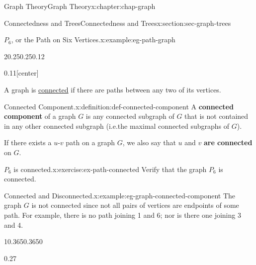 \documentclass[oneside,10pt,]{book}
\newcommand{\terminology}[1]{\textbf{#1}}
\numberwithin{equation}{section}
\begin{document}
\begin{chapterptx}{Graph Theory}{}{Graph Theory}{}{}{x:chapter:chap-graph}
\begin{sectionptx}{Connectedness and Trees}{}{Connectedness and Trees}{}{}{x:section:sec-graph-trees}
\begin{example}{\(P_6\), or the Path on Six Vertices.}{x:example:eg-path-graph}
\begin{sidebyside}{2}{0.25}{0.25}{0.12}
\begin{sbspanel}{0.11}[center]
{
}%
\end{sbspanel}%
\end{sidebyside}%
\end{example}
A graph is \hyperref[x:definition:def-connected]{connected} if there are paths between any two of its vertices.%
\begin{definition}{Connected Component.}{x:definition:def-connected-component}%
A \terminology{connected component} of a graph \(G\) is any connected subgraph of \(G\) that is not contained in any other connected subgraph (i.e.\@ the maximal connected subgraphs of \(G\)).%
\end{definition}
If there exists a \(u\)-\(v\) path on a graph \(G\), we also say that \(u\) and \(v\) \terminology{are connected} on \(G\).%
\begin{inlineexercise}{\(P_6\) is connected.}{x:exercise:ex-path-connected}%
Verify that the graph \(P_6\) is connected.%
\end{inlineexercise}
\begin{example}{Connected and Disconnected.}{x:example:eg-graph-connected-component}%
The graph \(G\) is not connected since not all pairs of vertices are endpoints of some path. For example, there is no path joining 1 and 6; nor is there one joining 3 and 4.%
\begin{sidebyside}{1}{0.365}{0.365}{0}%
\begin{sbspanel}{0.27}%
\end{sbspanel}
\end{sidebyside}
\end{example}
\end{sectionptx}
\end{chapterptx}
\end{document}
